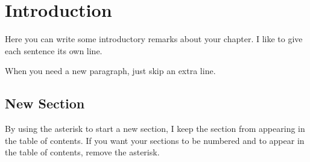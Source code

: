
\chapter*{Introduction} %



Here you can write some introductory remarks about your chapter.
I like to give each sentence its own line.

When you need a new paragraph, just skip an extra line.

\section*{New Section}

By using the asterisk to start a new section, I keep the section from appearing in the table of contents.
If you want your sections to be numbered and to appear in the table of contents, remove the asterisk.

